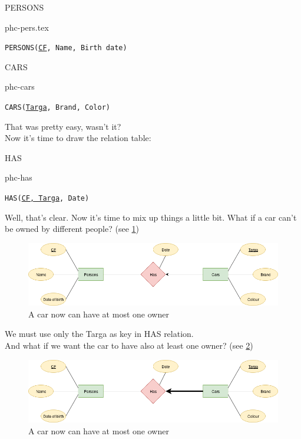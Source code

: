 \documentclass[class=book, crop=false, oneside]{standalone}
\begin{document}
\begin{minipage}{0.45\textwidth}
	PERSONS
	\begin{table}[H]
		\centering
		{phc-pers.tex}
	\end{table}
	\texttt{PERSONS(\underline{CF}, Name, Birth date)}
\end{minipage}
\hspace{.1\textwidth}
\begin{minipage}{.45\textwidth}
	CARS
	\begin{table}[H]
		\centering
		{phc-cars}
	\end{table}
	\texttt{CARS(\underline{Targa}, Brand, Color)}
\end{minipage}
\vskip 20pt
That was pretty easy, wasn't it?\\
Now it's time to draw the relation table:
\vskip 20pt
\begin{minipage}{.7\textwidth}
	HAS
	\begin{table}[H]
		{phc-has}
	\end{table}
	\texttt{HAS(\underline{CF, Targa}, Date)}
\end{minipage}
\vskip 20pt
Well, that's clear. Now it's time to mix up things a little bit.
What if a car can't be owned by different people? (see \ref{diagram1_01})
\begin{figure}[H]
	\centering
	\includegraphics[width=\textwidth,keepaspectratio]{diagram1_01.png}
	\caption{A car now can have at most one owner}
	\label{diagram1_01}
\end{figure}
We must use only the Targa as key in HAS relation.
\\
And what if we want the car to have also at least one owner? (see \ref{diagram1_02})
\begin{figure}[H]
	\centering
	\includegraphics[width=\textwidth,keepaspectratio]{diagram1_02.png}
	\caption{A car now can have at most one owner}
	\label{diagram1_02}
\end{figure}
\end{document}
